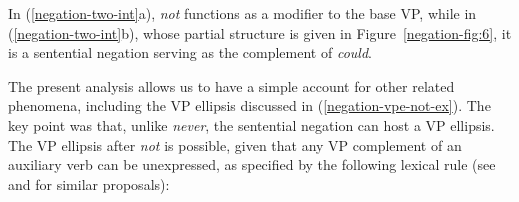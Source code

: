 \documentclass[output=paper
 	        ,biblatex
                ,babelshorthands
                ,newtxmath
                ,draftmode
                ,colorlinks, citecolor=brown
]{langscibook}
\begin{document}
\begin{exe}
\begin{xlist}
\begin{exe}
\begin{xlist}
\eal
\label{negation-two-int}
\zl
%
In (\ref{negation-two-int}a), \textit{not} functions as a modifier to
the base VP, while  in (\ref{negation-two-int}b), whose partial structure is
given in Figure~\ref{negation-fig:6}, it is a sentential
negation serving as the complement of \emph{could}.

The present analysis allows us to have a simple account for other related phenomena,
including the VP ellipsis discussed in (\ref{negation-vpe-not-ex}). The key point
was that, unlike \textit{never}, the sentential negation can
host a VP ellipsis.  The VP ellipsis after \textit{not} is
possible, given that any VP complement of an auxiliary
verb can be unexpressed, as
specified by the following lexical rule (see \citealt[]{Kim:00} and \citealt[]{kimmichaelis:2020} for similar proposals):



\end{xlist}
\end{exe}
\end{xlist}
\end{exe}
\end{document}
